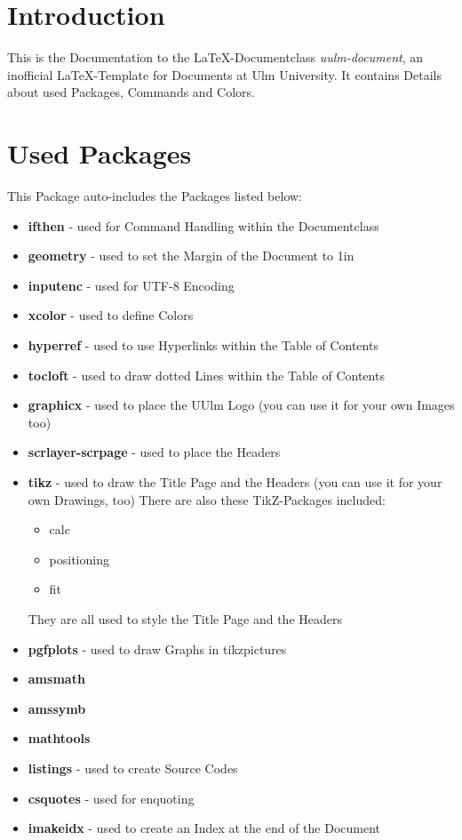 \documentclass[a4paper]{../uulm-document}
\begin{document}
\maketitle
\tableofcontents

\section{Introduction}
This is the Documentation to the \LaTeX -Documentclass \textit{uulm-document}, an inofficial \LaTeX -Template for Documents at Ulm University. It contains Details about used Packages, Commands and Colors.

\section{Used Packages}
This Package auto-includes the Packages listed below:
\begin{itemize}
\item \textbf{ifthen} - used for Command Handling within the Documentclass
\item \textbf{geometry} - used to set the Margin of the Document to 1in
\item \textbf{inputenc} - used for UTF-8 Encoding
\item \textbf{xcolor} - used to define Colors
\item \textbf{hyperref} - used to use Hyperlinks within the Table of Contents
\item \textbf{tocloft} - used to draw dotted Lines within the Table of Contents
\item \textbf{graphicx} - used to place the UUlm Logo (you can use it for your own Images too)
\item \textbf{scrlayer-scrpage} - used to place the Headers
\item \textbf{tikz} - used to draw the Title Page and the Headers (you can use it for your own Drawings, too)
There are also these TikZ-Packages included:
\begin{itemize}
\item calc
\item positioning
\item fit
\end{itemize}
They are all used to style the Title Page and the Headers
\item \textbf{pgfplots} - used to draw Graphs in tikzpictures
\item \textbf{amsmath}
\item \textbf{amssymb}
\item \textbf{mathtools}
\item \textbf{listings} - used to create Source Codes
\item \textbf{csquotes} - used for enquoting
\item \textbf{imakeidx} - used to create an Index at the end of the Document
\end{itemize}
\end{document}
